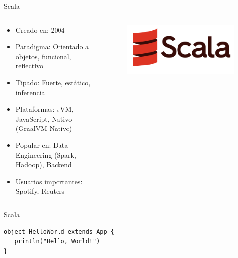 \documentclass[aspectratio=169]{beamer}
\begin{document}
\begin{frame}{Scala}
	\begin{columns}[T] %
		\begin{column}[T]{0.5\textwidth} %
			\begin{itemize}
				\item Creado en: 2004
				\item Paradigma: Orientado a objetos, funcional, reflectivo
				\item Tipado: Fuerte, estático, inferencia
				\item Plataformas: JVM, JavaScript, Nativo (GraalVM Native)
				\item Popular en: Data Engineering (Spark, Hadoop), Backend
				\item Usuarios importantes: Spotify, Reuters
			\end{itemize}
		\end{column}
		\begin{column}[T]{7cm} %
			\begin{figure}
				\centering
				\includegraphics[width=0.5\linewidth]{Images/scala}
			\end{figure}
			
		\end{column}
	\end{columns}
\end{frame}

\begin{frame}[fragile]{Scala}
\begin{lstlisting}
object HelloWorld extends App {
   println("Hello, World!")
}
\end{lstlisting}
\end{frame}
\end{document}
